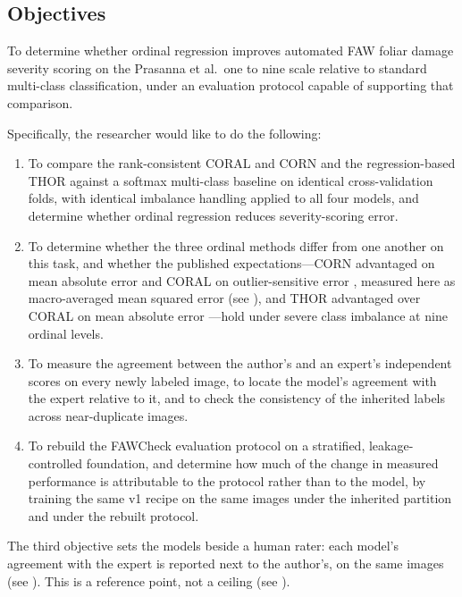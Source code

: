 \documentclass{icsthesis}
\newcommand{\secref}[1]{\textit{\nameref{#1}}}
\begin{document}
\begin{mainmatter}
			\subsection{Objectives}\label{sec:objectives}

				To determine whether ordinal regression improves automated FAW foliar damage
				severity scoring on the Prasanna et al.\ one to nine scale relative to standard
				multi-class classification, under an evaluation protocol capable of supporting that
				comparison.

				Specifically, the researcher would like to do the following:

				\begin{enumerate}
					\item To compare the rank-consistent CORAL \citep{cao2020} and CORN
						\citep{shi2023corn} and the regression-based THOR \citep{fuchs2022} against
						a softmax multi-class baseline on identical cross-validation folds, with
						identical imbalance handling \citep{kang2020} applied to all four models,
						and determine whether ordinal regression reduces severity-scoring error.
					\item To determine whether the three ordinal methods differ from one another on
						this task, and whether the published expectations---CORN advantaged on mean
						absolute error and CORAL on outlier-sensitive error \citep{shi2023corn},
						measured here as macro-averaged mean squared error (see
						\secref{sec:evaluation}), and THOR advantaged over CORAL on mean absolute
						error \citep{fuchs2022}---hold under severe class imbalance at nine ordinal
						levels.
					\item To measure the agreement between the author's and an expert's independent
						scores on every newly labeled image, to locate the model's agreement with
						the expert relative to it, and to check the consistency of the inherited
						labels across near-duplicate images.
					\item To rebuild the FAWCheck evaluation protocol on a stratified,
						leakage-controlled foundation, and determine how much of the change in
						measured performance is attributable to the protocol rather than to the
						model, by training the same v1 recipe on the same images under the inherited
						partition and under the rebuilt protocol.
				\end{enumerate}

				The third objective sets the models beside a human rater: each model's agreement with
				the expert is reported next to the author's, on the same images (see
				\secref{sec:humanref}). This is a reference point, not a ceiling (see
				\secref{sec:scope}).


\end{mainmatter}
\end{document}
